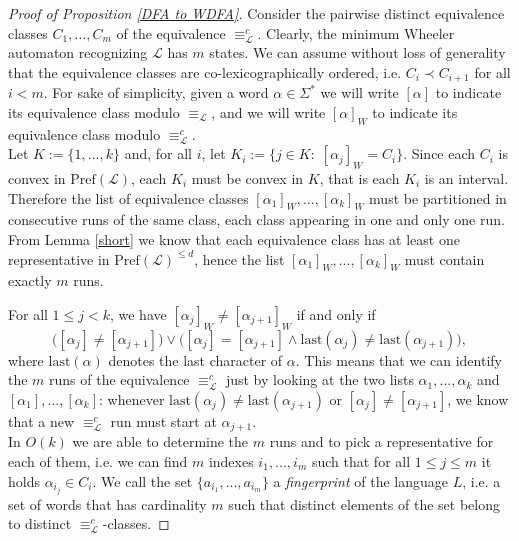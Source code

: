 \documentclass[runningheads]{llncs}
\newcommand{\pf}[1]{\text{Pref}(\mathcal #1)}
\begin{document}
\begin{proof}[\noindent Proof of Proposition \ref{DFA to WDFA}]
Consider the pairwise distinct equivalence classes $C_1, \dots, C_m$ of the equivalence $\equiv_\mathcal L^c$. Clearly, the minimum Wheeler automaton recognizing $\mathcal L$ has $m$ states. We can assume without loss of generality that the equivalence classes are co-lexicographically ordered, i.e. $C_i \prec C_{i+1}$ for all $i<m$. For sake of simplicity, given a word $\alpha \in \Sigma^*$ we will write $[\alpha]$ to indicate its equivalence class modulo $\equiv_\mathcal L$, and we will write $[\alpha]_W$ to indicate its equivalence class modulo $\equiv_\mathcal L^c$. 
\\Let $K := \{ 1, ..., k \}$ and, for all $i$, let $K_i := \{ j\in K:\; [\alpha_j]_W = C_i \}$. Since each $C_i$ is convex in $\pf L$, each $K_i$ must be convex in $K$, that is each $K_i$ is an interval.  
Therefore the list of equivalence classes $[\alpha_1]_W, ..., [\alpha_k]_W$ must be partitioned in consecutive runs of the same class, each class appearing in one and only one run. From Lemma \ref{short} we know that each equivalence class has at least one representative in $\pf L^{\le d}$, hence the list $[\alpha_1]_W, ..., [\alpha_k]_W$ must contain exactly $m$ runs. 

For all $1 \le j < k$, we have $[\alpha_j]_W \ne [\alpha_{j+1}]_W$ if and only if
\[\Big( [\alpha_j] \ne [\alpha_{j+1}] \Big) \vee \Big( [\alpha_j] = [\alpha_{j+1}] \wedge \text{last}(\alpha_j) \ne \text{last}(\alpha_{j+1}) \Big), \]
where $\text{last}(\alpha)$ denotes the last character of $\alpha$. This means that we can identify the $m$ runs of the equivalence $\equiv_\mathcal L^c$ just by looking at the two lists $\alpha_1, ..., \alpha_k$ and $[\alpha_1], ..., [\alpha_k]$: whenever $\text{last}(\alpha_j) \ne \text{last}(\alpha_{j+1})$ or $[\alpha_j] \ne [\alpha_{j+1}]$, we know that a new $\equiv_\mathcal L^c$ run must start at $\alpha_{j+1}$. 
\\In $O(k)$ we are able to determine the $m$ runs and to pick a representative for each of them, i.e. we can find $m$ indexes $i_1, ..., i_m$ such that for all $1 \le j \le m$ it holds $\alpha_{i_j} \in C_i$. We call the set $\{ a_{i_1}, ..., a_{i_m} \}$ a \textit{fingerprint} of the language $L$, i.e. a set of words that has cardinality $m$ such that distinct elements of the set belong to distinct $\equiv_\mathcal L^c$-classes.


\end{proof}
\end{document}
